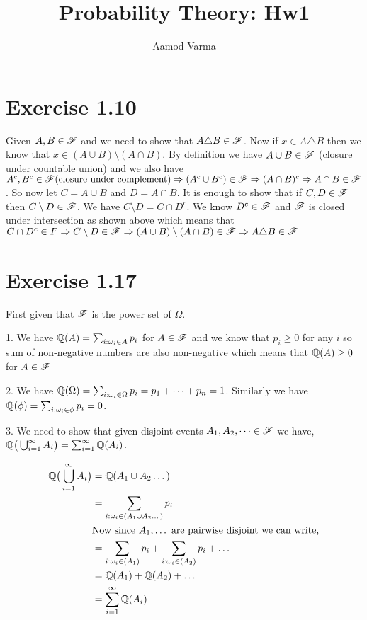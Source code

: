 \documentclass[a4paper]{report}
\title{Probability Theory: Hw1}
\author{Aamod Varma}
\begin{document}
\maketitle
\date{}


\section*{Exercise 1.10}
Given $A, B \in \mathscr{F}$ and we need to show that  $A \triangle B \in \mathscr{F}$. Now  if  $x \in A \triangle B$ then we know that  $x \in (A \cup B) \setminus (A \cap B)$. By definition we have  $A \cup B \in \mathscr{F}$ (closure under countable union) and we also have  $A^{c}, B^{c} \in \mathscr{F} \text{(closure under complement)} \Rightarrow (A^{c} \cup B^{c}) \in \mathscr{F} \Rightarrow (A \cap B)^{c} \Rightarrow A \cap B \in \mathscr{F}  $. So now let $C = A \cup B$ and  $D = A \cap B$. It is enough to show that if $C,D \in \mathscr{F}$ then  $C \setminus D \in \mathscr{F}$. We have  $C \setminus D = C \cap D^{c}$. We know $D^{c} \in \mathscr{F}$ and $\mathscr{F}$ is closed under intersection as shown above which means that  $C \cap D^{c} \in F \Rightarrow C \setminus D \in \mathscr{F} \Rightarrow (A \cup B) \setminus (A \cap B) \in \mathscr{F} \Rightarrow A \triangle B \in \mathscr{F} $

\section*{Exercise 1.17}

First given that $\mathscr{F}$ is the power set of  $\Omega$. 

1. We have $\mathbb{Q}(A) = \sum_{i: \omega_i \in A} p_i$ for  $A \in \mathscr{F}$ and we know that  $p_i \ge 0$ for any  $i$ so sum of non-negative numbers are also non-negative which means that  $\mathbb{Q}(A) \ge 0$ for $A \in \mathscr{F}$

2. We have $\mathbb{Q}(\Omega) = \sum_{i: \omega_i \in \Omega} p_i = p_1 + \dots + p_n = 1$. Similarly we have $\mathbb{Q}(\phi) = \sum_{i: \omega_i \in \phi} p_i = 0$.

3. We need to show that given disjoint events  $A_1, A_2, \dots \in \mathscr{F}$ we have, $\mathbb{Q}\big ( \bigcup_{i = 1}^{\infty} A_i \big) = \sum_{i = 1}^{\infty} \mathbb{Q}(A_i)$.

\begin{align*}
    \mathbb{Q}\big ( \bigcup_{i = 1}^{\infty} A_i \big)  &= \mathbb{Q}(A_1 \cup A_2 \dots ) \\ &= \sum_{i: \omega_i \in (A_1 \cup A_2 \dots)} p_i \\
                                            &\text{Now since $A_1,\dots$ are pairwise disjoint we can write,}\\
                                            &=  \sum_{i: \omega_i \in (A_1)} p_i   + \sum_{i: \omega_i \in (A_2)} p_i  + \dots\\
                                            &= \mathbb{Q}(A_1) + \mathbb{Q}(A_2)  + \dots \\
                                            &= \sum_{i = 1}^{\infty} \mathbb{Q}(A_i)
\end{align*}
\end{document}
